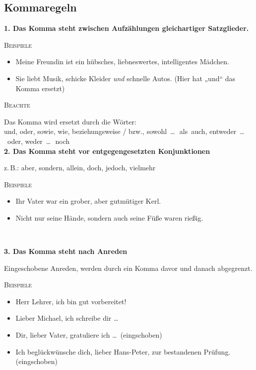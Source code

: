 \documentclass[landscape]{article}
\newcommand{\tbreak}{\\\vspace{-3mm}}
\newcommand*\glqq{„}
\newcommand*\grqq{“}
\newcommand{\gqm}[1]{\glqq #1\grqq}
\newcommand{\zB}{z.\,B.}
\begin{document}
\begin{multicols*}{3}

    \section*{Kommaregeln}

    \textbf{1. Das Komma steht zwischen Aufzählungen gleichartiger Satzglieder.}\tbreak

    \textsc{Beispiele}\\

    \begin{itemize}
        \item Meine Freundin ist ein hübsches, liebneswertes, intelligentes Mädchen.
        \item Sie liebt Musik, schicke Kleider \textit{und} schnelle Autos. {\footnotesize (Hier hat \gqm{und} das Komma ersetzt)}
    \end{itemize}

    \textsc{Beachte}\tbreak

    Das Komma wird ersetzt durch die Wörter:\\
    und, oder, sowie, wie, beziehungsweise / bzw., \mbox{sowohl \dots\, als auch}, \mbox{entweder \dots\, oder}, \mbox{weder \dots\, noch}\\

    \textbf{2. Das Komma steht vor entgegengesetzten Konjunktionen}\tbreak

    \zB: aber, sondern, allein, doch, jedoch, vielmehr\tbreak

    \textsc{Beispiele}\\
    
    \begin{itemize}
        \item Ihr Vater war ein grober, aber gutmütiger Kerl.
        \item Nicht nur seine Hände, sondern auch seine Füße waren rießig.
    \end{itemize}\quad\tbreak

    \textbf{3. Das Komma steht nach Anreden}\tbreak

    Eingeschobene Anreden, werden durch ein Komma davor und danach abgegrenzt.\tbreak

    \textsc{Beispiele}\\

    \begin{itemize}
        \item Herr Lehrer, ich bin gut vorbereitet!
        \item Lieber Michael, ich schreibe dir \dots
        \item Dir, lieber Vater, gratuliere ich \dots\, {\footnotesize(eingschoben)}
        \item Ich beglückwünsche dich, lieber Hans-Peter, zur bestandenen Prüfung. {\footnotesize(eingschoben)}
    \end{itemize}\quad\tbreak


\end{multicols*}
\end{document}
